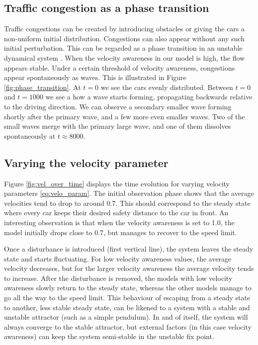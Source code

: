 \documentclass[11pt,a4paper,twocolumn]{article}
\begin{document}
\subsection{Traffic congestion as a phase transition} \label{sec:phase}
Traffic congestions can be created by introducing obstacles or giving the cars a non-uniform initial distribution. Congestions can also appear without any such initial perturbation. This can be regarded as a phase transition in an unstable dynamical system \cite{bando1995dynamical}. When the velocity awareness in our model is high, the flow appears stable. Under a certain threshold of velocity awareness, congestions appear spontaneously as waves. This is illustrated in Figure \ref{fig:phase_transition}. At $t=0$ we see the cars evenly distributed. Between $t=0$ and $t=1000$ we see a how a wave starts forming, propagating backwards relative to the driving direction. We can observe a secondary smaller wave forming shortly after the primary wave, and a few more even smaller waves. Two of the small waves merge with the primary large wave, and one of them dissolves spontaneously at $t \approx 8000$. 

\subsection{Varying the velocity parameter}\label{sec:vel_param}
Figure \ref{fig:vel_over_time} displays the time evolution for varying velocity parameters \eqref{eq:velo_param}. The initial observation phase shows that the average velocities tend to drop to around 0.7.
This should correspond to the steady state where every car keeps their desired safety distance to the car in front.%
An interesting observation is that when the velocity awareness is set to 1.0, the model initially drops close to 0.7, but manages to recover to the speed limit. %

Once a disturbance is introduced (first vertical line), the system leaves the steady state and starts fluctuating. For low velocity awareness values, the average velocity decreases, but for the larger velocity awareness the average velocity tends to increase.
After the disturbance is removed, the models with low velocity awareness slowly return to the steady state, whereas the other models manage to go all the way to the speed limit. This behaviour of escaping from a steady state to another, less stable steady state, can be likened to a system with a stable and unstable attractor (such as a simple pendulum). In and of itself, the system will always converge to the stable attractor, but external factors (in this case velocity awareness) can keep the system semi-stable in the unstable fix point.
\end{document}
